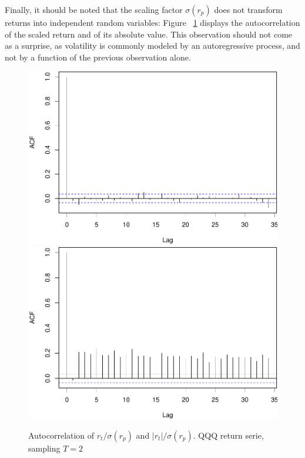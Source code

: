 \documentclass[
  11pt,
]{article}
\newenvironment{Shaded}{\begin{snugshade}}{\end{snugshade}}
\newcommand{\AttributeTok}[1]{\textcolor[rgb]{0.77,0.63,0.00}{#1}}
\newcommand{\DecValTok}[1]{\textcolor[rgb]{0.00,0.00,0.81}{#1}}
\newcommand{\FloatTok}[1]{\textcolor[rgb]{0.00,0.00,0.81}{#1}}
\newcommand{\FunctionTok}[1]{\textcolor[rgb]{0.00,0.00,0.00}{#1}}
\newcommand{\NormalTok}[1]{#1}
\newcommand{\OtherTok}[1]{\textcolor[rgb]{0.56,0.35,0.01}{#1}}
\newcommand{\SpecialCharTok}[1]{\textcolor[rgb]{0.00,0.00,0.00}{#1}}
\newcommand{\StringTok}[1]{\textcolor[rgb]{0.31,0.60,0.02}{#1}}
\begin{document}
Finally, it should be noted that the scaling factor \(\sigma(r_p)\) does not
transform returns into independent random variables:
Figure~ \ref{fig:acf} displays
the autocorrelation of the scaled return and of its absolute value. This
observation should not come as a surprise, as volatility is commonly
modeled by an autoregressive process, and not by a function of the
previous observation alone.

\begin{Shaded}
\end{Shaded}

\begin{figure}[H]
\includegraphics[width=0.5\linewidth]{figs/acf-1} \includegraphics[width=0.5\linewidth]{figs/acf-2} \caption{Autocorrelation of $r_t/\sigma(r_p)$ and $|r_t|/\sigma(r_p)$. QQQ return serie, sampling $T=2$}\label{fig:acf}
\end{figure}
\end{document}
